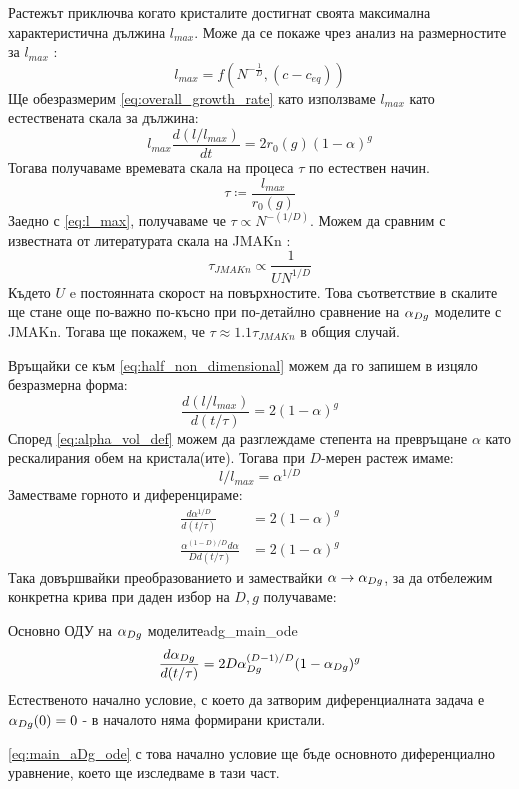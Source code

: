 Растежът приключва когато кристалите достигнат своята максимална характеристична дължина $l_{max}$. Може да се покаже чрез анализ на размерностите за $l_{max}$ \cite{Tsoularis2002}:
\begin{equation}
	\label{eq:l_max}
	l_{max} = f\left(N^{-\frac{1}{D}}, (c-c_{eq}) \right)
\end{equation}
Ще обезразмерим \autoref{eq:overall_growth_rate} като използваме $l_{max}$ като естествената скала за дължина:
\begin{equation}
	\label{eq:half_non_dimensional}
	l_{max} \frac{d(l/{l_{max}})}{dt} = 2r_0(g)(1-\alpha)^g
\end{equation}
Тогава получаваме времевата скала на процеса $\tau$ по естествен начин.
\begin{equation}
	\label{eq:time_scale}
	\tau \coloneqq \frac{l_{max}}{r_0(g)}
\end{equation}
Заедно с \autoref{eq:l_max}, получаваме че $\tau \propto N^{-(1/D)}$. Можем да сравним с известната от литературата скала на JMAKn \cite{Avramov2005}:
\begin{equation}
	\label{eq:jmak_time_scale}
	\tau_{JMAKn} \propto \frac{1}{U N^{1/D}}
\end{equation}
Където $U$ e постоянната скорост на повърхностите. Това съответствие в скалите ще стане още по-важно по-късно при по-детайлно сравнение на $\alpha_{Dg}$ моделите с JMAKn. Тогава ще покажем, че $\tau \approx 1.1 \tau_{JMAKn}$ в общия случай.

\noindent Връщайки се към \autoref{eq:half_non_dimensional} можем да го запишем в изцяло безразмерна форма:
\begin{equation}
	\frac{d(l/l_{max})}{d(t/\tau)} = 2(1-\alpha)^g
\end{equation}
Според \autoref{eq:alpha_vol_def} можем да разглеждаме степента на превръщане $\alpha$ като рескалирания обем на кристала(ите). Тогава при $D$-мерен растеж имаме:
\begin{equation*}
	l/l_{max} = \alpha^{1/D}
\end{equation*}
Заместваме горното и диференцираме:
\begin{align*}
	\frac{d \alpha ^ {1/D}}{d(t/\tau)}            & = 2(1-\alpha)^g \\
	\frac{\alpha^{(1-D)/D} d \alpha}{D d(t/\tau)} & = 2(1-\alpha)^g 
\end{align*}
Така довършвайки преобразованието и замествайки $\alpha \rightarrow \alpha_{Dg}$, за да отбележим конкретна крива при даден избор на $D, g$ получаваме:
\begin{result}{Основно ОДУ на $\alpha_{Dg}$ моделите}{adg_main_ode}
	\begin{equation}
		\label{eq:main_aDg_ode}
		\frac{d\alpha_{Dg}}{d(t/\tau)} = 2D\alpha_{Dg}^{(D-1)/D}(1-\alpha_{Dg})^g
	\end{equation}
	Естественото начално условие, с което да затворим диференциалната задача е $\alpha_{Dg}(0) = 0$ - в началото няма формирани кристали.  
\end{result}
\noindent \autoref{eq:main_aDg_ode} с това начално условие ще бъде основното диференциално уравнение, което ще изследваме в тази част.

